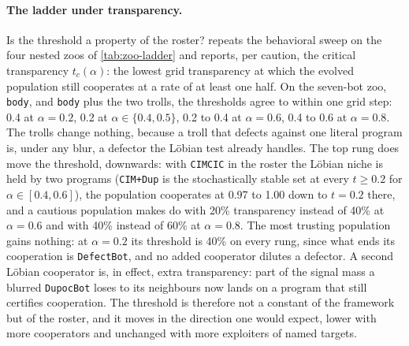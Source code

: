 \paragraph{The ladder under transparency.}
Is the threshold a property of the roster?  repeats the behavioral sweep on the four nested zoos of \cref{tab:zoo-ladder} and reports, per caution, the critical transparency $t_c(\alpha)$: the lowest grid transparency at which the evolved population still cooperates at a rate of at least one half. On the seven-bot zoo, \texttt{body}, and \texttt{body} plus the two trolls, the thresholds agree to within one grid step: 0.4 at $\alpha = 0.2$, 0.2 at $\alpha \in \{0.4, 0.5\}$, 0.2 to 0.4 at $\alpha = 0.6$, 0.4 to 0.6 at $\alpha = 0.8$. The trolls change nothing, because a troll that defects against one literal program is, under any blur, a defector the Löbian test already handles. The top rung does move the threshold, downwards: with \texttt{CIMCIC} in the roster the Löbian niche is held by two programs (\texttt{CIM+Dup} is the stochastically stable set at every $t \ge 0.2$ for $\alpha \in [0.4, 0.6]$), the population cooperates at 0.97 to 1.00 down to $t = 0.2$ there, and a cautious population makes do with 20\% transparency instead of 40\% at $\alpha = 0.6$ and with 40\% instead of 60\% at $\alpha = 0.8$. The most trusting population gains nothing: at $\alpha = 0.2$ its threshold is 40\% on every rung, since what ends its cooperation is \texttt{DefectBot}, and no added cooperator dilutes a defector. A second Löbian cooperator is, in effect, extra transparency: part of the signal mass a blurred \texttt{DupocBot} loses to its neighbours now lands on a program that still certifies cooperation. The threshold is therefore not a constant of the framework but of the roster, and it moves in the direction one would expect, lower with more cooperators and unchanged with more exploiters of named targets.



